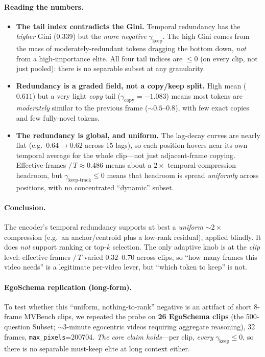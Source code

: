 \documentclass[11pt]{article}
\newcommand{\gkeep}{\gamma_{\mathrm{keep}}}
\newcommand{\gcopy}{\gamma_{\mathrm{copy}}}
\begin{document}
\paragraph{Reading the numbers.}
\begin{itemize}
\item \textbf{The tail index contradicts the Gini.} Temporal redundancy has the
      \emph{higher} Gini (0.339) but the \emph{more negative} $\gkeep$. The high
      Gini comes from the mass of moderately-redundant tokens dragging the bottom
      down, \emph{not} from a high-importance elite. All four tail indices are
      $\le0$ (on every clip, not just pooled): there is no separable subset at any
      granularity.
\item \textbf{Redundancy is a graded field, not a copy/keep split.} High mean
      ($0.611$) but a very light \emph{copy} tail ($\gcopy=-1.083$) means most
      tokens are \emph{moderately} similar to the previous frame ($\sim0.5$--$0.8$),
      with few exact copies and few fully-novel tokens.
\item \textbf{The redundancy is global, and uniform.} The lag-decay curves are
      nearly flat (e.g.\ $0.64\!\to\!0.62$ across 15 lags), so each position hovers
      near its own temporal average for the whole clip---not just adjacent-frame
      copying. Effective-frames $/\,T\approx0.486$ means about a $2\times$
      temporal-compression headroom, but $\gamma_{\mathrm{keep\text{-}track}}\le0$
      means that headroom is spread \emph{uniformly} across positions, with no
      concentrated ``dynamic'' subset.
\end{itemize}

\paragraph{Conclusion.} The encoder's temporal redundancy supports at best a
\emph{uniform} $\sim2\times$ compression (e.g.\ an anchor/centroid plus a low-rank
residual), applied blindly. It does \emph{not} support ranking or top-$k$
selection. The only adaptive knob is at the \emph{clip} level: effective-frames
$/\,T$ varied $0.32$--$0.70$ across clips, so ``how many frames this video needs''
is a legitimate per-video lever, but ``which token to keep'' is not.

\paragraph{EgoSchema replication (long-form).} To test whether this
``uniform, nothing-to-rank'' negative is an artifact of short 8-frame MVBench clips,
we repeated the probe on \textbf{26 EgoSchema clips} (the 500-question Subset;
$\sim$3-minute egocentric videos requiring aggregate reasoning), 32 frames,
\texttt{max\_pixels}=200704. \emph{The core claim holds}---per clip, \emph{every}
$\gkeep\le0$, so there is no separable must-keep elite at long context either.
\end{document}
